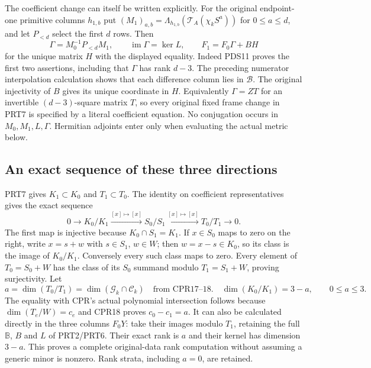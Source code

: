 \documentclass[11pt,a4paper]{article}
\begin{document}
The coefficient change can itself be written explicitly. For the original
endpoint-one primitive columns $h_{1,b}$ put
$ (M_1)_{a,b}=\Lambda_{h_{1,b}}(\mathcal T_A(\chi_kS^a))$
for $0\le a\le d$, and let $P_{<d}$ select the first $d$ rows.
Then
\[
 \Gamma=M_0^{-1}P_{<d}M_1,\qquad
 \operatorname{im}\Gamma=\ker L,\qquad
 F_1=F_0\Gamma+BH
 \tag{PRT7a}
\]
for the unique matrix $H$ with the displayed equality.
Indeed PDS11 proves the first two assertions, including that $\Gamma$
has rank $d-3$. The preceding numerator interpolation calculation
shows that each difference column lies in $\mathscr B$.
The original injectivity of $B$ gives its unique coordinate in $H$.
Equivalently $\Gamma=ZT$ for an invertible $(d-3)$-square matrix $T$,
so every original fixed frame change in PRT7 is specified by a literal
coefficient equation. No conjugation occurs in $M_0,M_1,L,\Gamma$.
Hermitian adjoints enter only when evaluating the actual metric below.

\subsection{An exact sequence of these three directions}

PRT7 gives $K_1\subset K_0$ and $T_1\subset T_0$. The identity on
coefficient representatives gives the exact sequence
\[
 0\longrightarrow K_0/K_1\xrightarrow{[x]\mapsto[x]}
 S_0/S_1\xrightarrow{[x]\mapsto[x]}T_0/T_1\longrightarrow0.
 \tag{PRT9}
\]
The first map is injective because $K_0\cap S_1=K_1$.
If $x\in S_0$ maps to zero on the right, write $x=s+w$ with
$s\in S_1$, $w\in W$; then $w=x-s\in K_0$, so its class is the
image of $K_0/K_1$. Conversely every such class maps to zero. Every
element of $T_0=S_0+W$ has the class of its $S_0$ summand modulo
$T_1=S_1+W$, proving surjectivity.
Let
\[
 a=\dim(T_0/T_1)=\dim(\mathcal G_k\cap\mathcal C_k)
                    \quad\text{from CPR17--18}.
 \quad
 \dim(K_0/K_1)=3-a,\qquad0\le a\le3.
 \tag{PRT10}
\]
The equality with CPR's actual polynomial intersection follows because
$\dim(T_e/W)=c_e$ and CPR18 proves $c_0-c_1=a$. It can also be
calculated directly in the three columns $F_0Y$: take their images
modulo $T_1$, retaining the full $\mathbb B$, $B$ and $L$ of
PRT2/PRT6. Their exact rank is $a$ and their kernel has dimension
$3-a$. This proves a complete original-data rank computation without
assuming a generic minor is nonzero. Rank strata, including $a=0$,
are retained.
\end{document}
